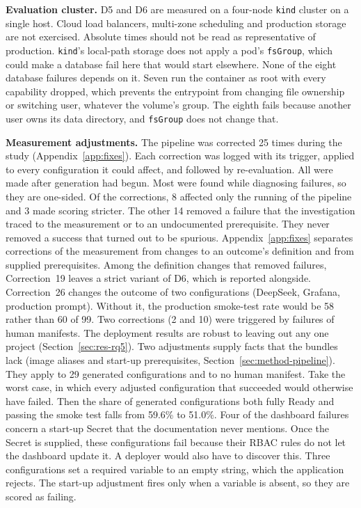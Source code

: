 \textbf{Evaluation cluster.} D5 and D6 are measured on a four-node \texttt{kind} cluster on a single host. Cloud load balancers, multi-zone scheduling and production storage are not exercised. Absolute times should not be read as representative of production. \texttt{kind}'s local-path storage does not apply a pod's \texttt{fsGroup}, which could make a database fail here that would start elsewhere. None of the eight database failures depends on it. Seven run the container as root with every capability dropped, which prevents the entrypoint from changing file ownership or switching user, whatever the volume's group. The eighth fails because another user owns its data directory, and \texttt{fsGroup} does not change that.

\textbf{Measurement adjustments.} The pipeline was corrected 25 times during the study (Appendix~\ref{app:fixes}). Each correction was logged with its trigger, applied to every configuration it could affect, and followed by re-evaluation. All were made after generation had begun. Most were found while diagnosing failures, so they are one-sided. Of the corrections, 8 affected only the running of the pipeline and 3 made scoring stricter. The other 14 removed a failure that the investigation traced to the measurement or to an undocumented prerequisite. They never removed a success that turned out to be spurious. Appendix~\ref{app:fixes} separates corrections of the measurement from changes to an outcome's definition and from supplied prerequisites. Among the definition changes that removed failures, Correction~19 leaves a strict variant of D6, which is reported alongside. Correction~26 changes the outcome of two configurations (DeepSeek, Grafana, production prompt). Without it, the production smoke-test rate would be 58 rather than 60 of 99. Two corrections (2 and 10) were triggered by failures of human manifests. The deployment results are robust to leaving out any one project (Section~\ref{sec:res-rq5}). Two adjustments supply facts that the bundles lack (image aliases and start-up prerequisites, Section~\ref{sec:method-pipeline}). They apply to 29 generated configurations and to no human manifest. Take the worst case, in which every adjusted configuration that succeeded would otherwise have failed. Then the share of generated configurations both fully Ready and passing the smoke test falls from 59.6\% to 51.0\%. Four of the dashboard failures concern a start-up Secret that the documentation never mentions. Once the Secret is supplied, these configurations fail because their RBAC rules do not let the dashboard update it. A deployer would also have to discover this. Three configurations set a required variable to an empty string, which the application rejects. The start-up adjustment fires only when a variable is absent, so they are scored as failing.

